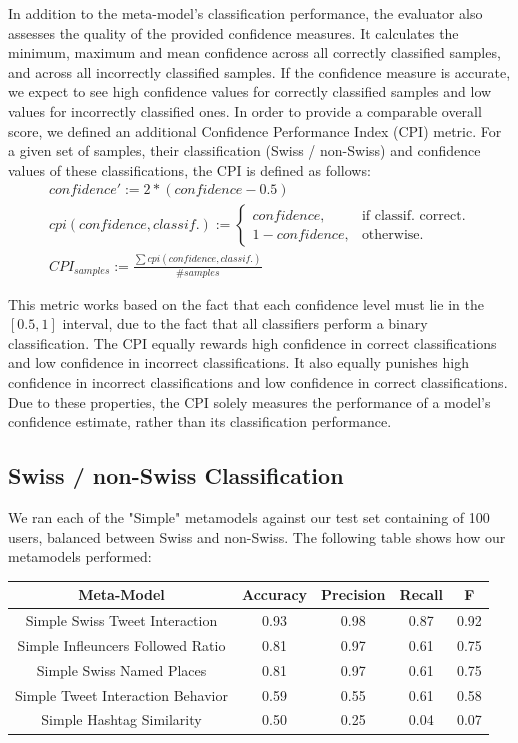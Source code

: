 \documentclass[10pt,a4paper]{article}
\begin{document}
In addition to the meta-model's classification performance, the evaluator also assesses the quality of the provided confidence measures. It calculates the minimum, maximum and mean confidence across all correctly classified samples, and across all incorrectly classified samples. If the confidence measure is accurate, we expect to see high confidence values for correctly classified samples and low values for incorrectly classified ones. In order to provide a comparable overall score, we defined an additional Confidence Performance Index (CPI) metric. For a given set of samples, their classification (Swiss / non-Swiss) and confidence values of these classifications, the CPI is defined as follows:
\begin{equation}
\begin{split}
confidence' := 2*(confidence-0.5) \\
cpi(confidence, classif.) := \begin{cases}
    confidence, & \text{if classif. correct}.\\
    1-confidence, & \text{otherwise}.
  \end{cases} \\
CPI_{samples} := \frac{\sum cpi(confidence, classif.)}{\#samples}
\end{split}
\end{equation}

This metric works based on the fact that each confidence level must lie in the $[0.5, 1]$ interval, due to the fact that all classifiers perform a binary classification. The CPI equally rewards high confidence in correct classifications and low confidence in incorrect classifications. It also equally punishes high confidence in incorrect classifications and low confidence in correct classifications. Due to these properties, the CPI solely measures the performance of a model's confidence estimate, rather than its classification performance.

\subsection{Swiss / non-Swiss Classification}
We ran each of the "Simple" metamodels against our test set containing of 100 users, balanced between Swiss and non-Swiss. The following table shows how our metamodels performed:

\begin{center}
\begin{tabular}{ |c|c|c|c|c| }
\hline
\textbf{Meta-Model} & \textbf{Accuracy} & \textbf{Precision} & \textbf{Recall} & \textbf{F} \\
\hline
Simple Swiss Tweet Interaction & 0.93 & 0.98 & 0.87 & 0.92 \\
\hline
Simple Infleuncers Followed Ratio & 0.81 & 0.97 & 0.61 & 0.75 \\
\hline
Simple Swiss Named Places & 0.81 & 0.97 & 0.61 & 0.75 \\
\hline
\hline
Simple Tweet Interaction Behavior & 0.59 & 0.55 & 0.61 & 0.58 \\
\hline
Simple Hashtag Similarity & 0.50 & 0.25 & 0.04 & 0.07 \\
\hline
\end{tabular}
\end{center}
\end{document}
